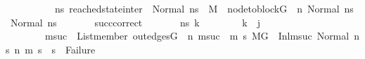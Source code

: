 \begin{isabellebody}
\ \ \ \ \ \ \ \ \ \ {\isacharparenleft}{\kern0pt}{\isasymforall}ns{}{\isacharprime}{\kern0pt}{\isachardot}{\kern0pt}\ reached{\isacharunderscore}{\kern0pt}state{\isacharunderscore}{\kern0pt}inter\ {\isacharequal}{\kern0pt}\ Normal\ ns{}{\isacharprime}{\kern0pt}\ {\isasymlongrightarrow}\ {\isacharparenleft}{\kern0pt}M{\isacharcomma}{\kern0pt}{\isasymLambda}{\isacharcomma}{\kern0pt}{\isasymGamma}{\isacharcomma}{\kern0pt}{\isasymOmega}\ {\isasymturnstile}\ {\isasymlangle}{\isacharparenleft}{\kern0pt}node{\isacharunderscore}{\kern0pt}to{\isacharunderscore}{\kern0pt}block{\isacharparenleft}{\kern0pt}G{\isacharparenright}{\kern0pt}\ {\isacharbang}{\kern0pt}\ n{\isacharparenright}{\kern0pt}{\isacharcomma}{\kern0pt}\ Normal\ ns{}{\isasymrangle}\ {\isacharbrackleft}{\kern0pt}{\isasymrightarrow}{\isacharbrackright}{\kern0pt}\ Normal\ ns{}{\isacharprime}{\kern0pt}{\isacharparenright}{\kern0pt}{\isacharparenright}{\kern0pt}{\isachardoublequoteclose}\isanewline
\ \ \ \ \ \ \ succ{\isacharunderscore}{\kern0pt}correct{\isacharcolon}{\kern0pt}\ \isanewline
\ \ \ \ {\isachardoublequoteopen}{\isasymAnd}\ \ ns{}{\isacharprime}{\kern0pt}{\isacharprime}{\kern0pt}\ k{\isachardot}{\kern0pt}\isanewline
\ \ \ \ \ \ \ \ k\ {\isacharless}{\kern0pt}\ j\ {\isasymLongrightarrow}\ \isanewline
\ \ \ \ \ \ \ \ {\isasymforall}msuc{}{\isachardot}{\kern0pt}\ \ List{\isachardot}{\kern0pt}member\ {\isacharparenleft}{\kern0pt}out{\isacharunderscore}{\kern0pt}edges{\isacharparenleft}{\kern0pt}G{\isacharparenright}{\kern0pt}\ {\isacharbang}{\kern0pt}\ n{\isacharparenright}{\kern0pt}\ msuc{}\ {\isasymlongrightarrow}\ {\isacharparenleft}{\kern0pt}{\isasymforall}m{}\ s{}{\isachardot}{\kern0pt}\ {\isacharparenleft}{\kern0pt}{\isacharparenleft}{\kern0pt}M{\isacharcomma}{\kern0pt}{\isasymLambda}{\isacharcomma}{\kern0pt}{\isasymGamma}{\isacharcomma}{\kern0pt}{\isasymOmega}{\isacharcomma}{\kern0pt}G\ {\isasymturnstile}\ {\isacharparenleft}{\kern0pt}Inl{\isacharparenleft}{\kern0pt}msuc{}{\isacharparenright}{\kern0pt}{\isacharcomma}{\kern0pt}\ Normal\ ns{}{\isacharprime}{\kern0pt}{\isacharprime}{\kern0pt}{\isacharparenright}{\kern0pt}\ {\isacharminus}{\kern0pt}n{\isasymrightarrow}{\isacharasterisk}{\kern0pt}\ {\isacharparenleft}{\kern0pt}m{}{\isacharcomma}{\kern0pt}\ s{}{\isacharparenright}{\kern0pt}{\isacharparenright}{\kern0pt}\ {\isasymlongrightarrow}\ s{}\ {\isasymnoteq}\ Failure{\isacharparenright}{\kern0pt}{\isacharparenright}{\kern0pt}\ {\isasymLongrightarrow}\isanewline

\end{isabellebody}

